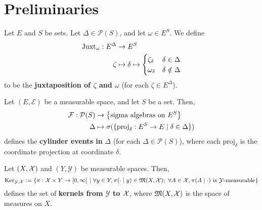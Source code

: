 \section{Preliminaries}

\begin{definition}[Juxtaposition]
    \label{def:juxtaposition}
    \leanok{}

    Let $E$ and $S$ be sets. Let $\Delta\in\mathcal{P}(S)$, and let $\omega\in E^S$. We define
    \begin{align}
        \operatorname{Juxt}_{\omega} : E^\Delta&\to E^S\\
        \zeta&\mapsto \delta\mapsto\begin{cases}
            \zeta_\delta & \delta\in\Delta\\
            \omega_\delta & \delta\notin\Delta
        \end{cases}
    \end{align}
    to be the \textbf{juxtaposition of $\zeta$ and $\omega$} (for each $\zeta\in E^\Delta$).
\end{definition}

\begin{definition}
    \label{def:cylinder-event}
    \leanok{}

    Let $(E,\mathcal{E})$ be a measurable space, and let $S$ be a set. Then,
    \begin{align}
        \mathcal{F}:\mathcal{P}(S)&\to \left\{ \text{sigma algebras on } E^S \right\}\\
        \Delta&\mapsto \sigma(\{\text{proj}_\delta:E^S\to E\mid \delta\in \Delta\})
    \end{align}
    defines the \textbf{cylinder events in }$\Delta$ (for each $\Delta\in\mathcal{P}(S)$),
    where each $\text{proj}_\delta$ is the coordinate projection at coordinate $\delta$.
\end{definition}

\begin{definition}[Kernel]
    \label{def:kernel}
    \leanok{}

    Let $(X,\mathcal X)$ and $(Y,\mathcal{Y})$ be measurable spaces. Then,
    \[\text{Ker}_{\mathcal{Y},\mathcal X}:=\left\{\pi:\mathcal X\times Y\to[0,\infty]~\middle\vert~ \forall y\in Y,\pi(\cdot\mid y)\in\mathfrak{M}(X,\mathcal X);~\forall A\in\mathcal X,\pi(A\mid\cdot)\text{ is }\mathcal{Y}\text{-measurable}\right\}\]
    defines the set of \textbf{kernels from $\mathcal{Y}$ to $\mathcal X$}, where $\mathfrak{M}(X,\mathcal X)$ is the space of measures on $X$.
\end{definition}

